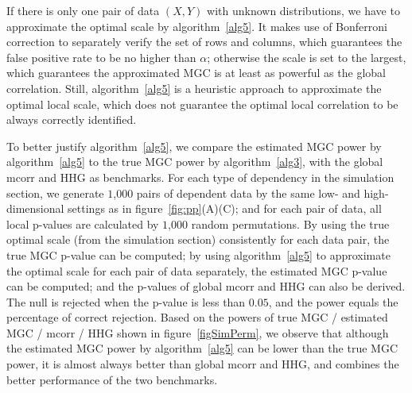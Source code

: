 \documentclass[11pt]{article}
\begin{document}
If there is only one pair of data $(X,Y)$ with unknown distributions, we have to approximate the optimal scale by algorithm~\ref{alg5}. It makes use of Bonferroni correction to separately verify the set of rows and columns, which guarantees the false positive rate to be no higher than $\alpha$; otherwise the scale is set to the largest, which guarantees the approximated MGC is at least as powerful as the global correlation. Still, algorithm~\ref{alg5} is a heuristic approach to approximate the optimal local scale, which does not guarantee the optimal local correlation to be always correctly identified.


To better justify algorithm~\ref{alg5}, we compare the estimated MGC power by algorithm~\ref{alg5} to the true MGC power by algorithm~\ref{alg3}, with the global mcorr and HHG as benchmarks. For each type of dependency in the simulation section, we generate $1$,$000$ pairs of dependent data by the same low- and high-dimensional settings as in figure~\ref{fig:pp}(A)(C); and for each pair of data, all local p-values are calculated by $1$,$000$ random permutations. By using the true optimal scale (from the simulation section) consistently for each data pair, the true MGC p-value can be computed; by using algorithm~\ref{alg5} to approximate the optimal scale for each pair of data separately, the estimated MGC p-value can be computed; and the p-values of global mcorr and HHG can also be derived. The null is rejected when the p-value is less than $0.05$, and the power equals the percentage of correct rejection. Based on the powers of true MGC / estimated MGC / mcorr / HHG shown in figure~\ref{figSimPerm}, we observe that although the estimated MGC power by algorithm~\ref{alg5} can be lower than the true MGC power, it is almost always better than global mcorr and HHG, and combines the better performance of the two benchmarks. 
\end{document}

